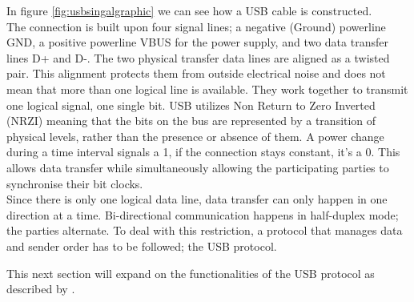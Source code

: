 In figure \ref{fig:usbsingalgraphic} we can see how a USB cable is constructed. \\
The connection is built upon four signal lines; a negative (Ground) powerline GND, a positive powerline VBUS for the power supply, and two data transfer lines D+ and D-. The two physical transfer data lines are aligned as a twisted pair. This alignment protects them from outside electrical noise and does not mean that more than one logical line is available. They work together to transmit one logical signal, one single bit. USB utilizes Non Return to Zero Inverted (NRZI) meaning that the bits on the bus are represented by a transition of physical levels, rather than the presence or absence of them. A power change during a time interval signals a 1, if the connection stays constant, it's a 0. This allows data transfer while simultaneously allowing the participating parties to synchronise their bit clocks.  \\
Since there is only one logical data line, data transfer can only happen in one direction at a time. Bi-directional communication happens in half-duplex mode; the parties alternate. To deal with this restriction, a protocol that manages data and sender order has to be followed; the USB protocol.  

This next section will expand on the functionalities of the USB protocol as described by \cite{nissimUSBbasedAttacks2017}. 

